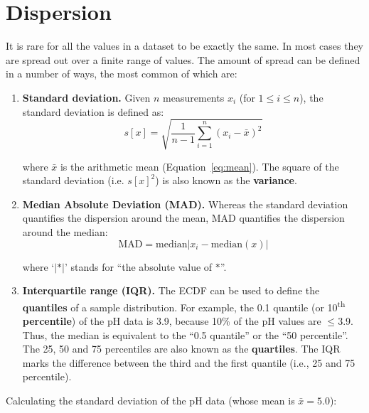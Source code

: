 \section{Dispersion}
\label{sec:dispersion}

It is rare for all the values in a dataset to be exactly the same. In
most cases they are spread out over a finite range of values. The
amount of spread can be defined in a number of ways, the most common
of which are:

\begin{enumerate}

\item{\bf Standard deviation.} Given $n$ measurements $x_i$ (for $1
  \leq i \leq n$), the standard deviation is defined as:
\begin{equation}
  s[x] = \sqrt{\frac{1}{n-1}\sum\limits_{i=1}^{n}(x_i-\bar{x})^2}
  \label{eq:stdev}
\end{equation}

\noindent where $\bar{x}$ is the arithmetic mean
(Equation~\ref{eq:mean}). The square of the standard deviation
(i.e. $s[x]^2$) is also known as the \textbf{variance}.

\item{\bf Median Absolute Deviation (MAD).} Whereas the standard
  deviation quantifies the dispersion around the mean, MAD quantifies
  the dispersion around the median:
  \begin{equation}
    \mbox{MAD} = \mbox{median}|x_i - \mbox{median}(x)|
    \label{eq:MAD}
  \end{equation}

  \noindent where `$|\ast|$' stands for ``the absolute value of
  $\ast$''.
  
\item{\bf Interquartile range (IQR).} The ECDF can be used to define
  the \textbf{quantiles} of a sample distribution. For example, the
  0.1 quantile (or 10\textsuperscript{th} \textbf{percentile}) of the
  pH data is 3.9, because 10\% of the pH values are $\leq$3.9. Thus,
  the median is equivalent to the ``0.5 quantile'' or the ``50
  percentile''. The 25, 50 and 75 percentiles are also known as the
  \textbf{quartiles}. The IQR marks the difference between the third
  and the first quantile (i.e., 25 and 75 percentile).
  
\end{enumerate}

Calculating the standard deviation of the pH data (whose mean is
$\bar{x} = 5.0$):

